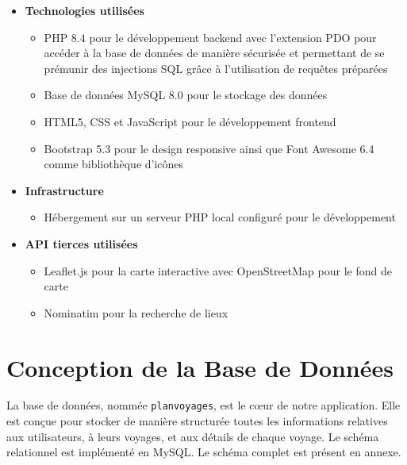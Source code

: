 \documentclass[a4paper,12pt]{article}
\begin{document}
\begin{itemize}
  \item \textbf{Technologies utilisées}
  \begin{itemize}
    \item PHP 8.4 pour le développement backend avec l'extension PDO pour accéder à la base de données de manière sécurisée et permettant de se prémunir des injections SQL grâce à l'utilisation de requêtes préparées
    \item Base de données MySQL 8.0 pour le stockage des données
    \item HTML5, CSS et JavaScript pour le développement frontend
    \item Bootstrap 5.3 pour le design responsive ainsi que Font Awesome 6.4 comme bibliothèque d'icônes
  \end{itemize}

  \item \textbf{Infrastructure}
  \begin{itemize}
    \item Hébergement sur un serveur PHP local configuré pour le développement
  \end{itemize}

  \item \textbf{API tierces utilisées}
  \begin{itemize}
    \item Leaflet.js pour la carte interactive avec OpenStreetMap pour le fond de carte
    \item Nominatim pour la recherche de lieux
  \end{itemize}
\end{itemize}

\section{Conception de la Base de Données}
La base de données, nommée \texttt{planvoyages}, est le cœur de notre application. Elle est conçue pour stocker de manière structurée toutes les informations relatives aux utilisateurs, à leurs voyages, et aux détails de chaque voyage. Le schéma relationnel est implémenté en MySQL. Le schéma complet est présent en annexe.
\end{document}
